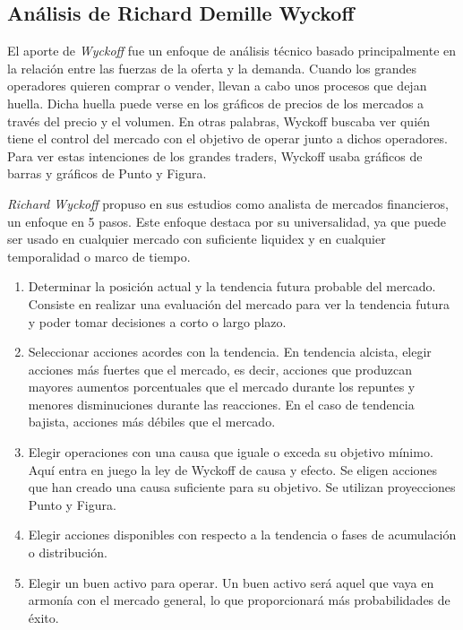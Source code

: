 \subsection{Análisis de Richard Demille Wyckoff}

El aporte de \textit{Wyckoff} fue un enfoque de análisis técnico basado principalmente en la relación entre las fuerzas de la oferta y la demanda. Cuando los grandes operadores quieren comprar o vender, llevan a cabo unos procesos que dejan huella. Dicha huella puede verse en los gráficos de precios de los mercados a través del precio y el volumen. En otras palabras, Wyckoff buscaba ver quién tiene el control del mercado con el objetivo de operar junto a dichos operadores. Para ver estas intenciones de los grandes traders, Wyckoff usaba gráficos de barras y gráficos de Punto y Figura. \newline

\textit{Richard Wyckoff} propuso en sus estudios como analista de mercados financieros, un enfoque en 5 pasos. Este enfoque destaca por su universalidad, ya que puede ser usado en cualquier mercado con suficiente liquidex y en cualquier temporalidad o marco de tiempo. \newline

\begin{enumerate}
	\item Determinar la posición actual y la tendencia futura probable del mercado. Consiste en realizar una evaluación del mercado para ver la tendencia futura y poder tomar decisiones a corto o largo plazo.
	\item Seleccionar acciones acordes con la tendencia. En tendencia alcista, elegir acciones más fuertes que el mercado, es decir, acciones que produzcan mayores aumentos porcentuales que el mercado durante los repuntes y menores disminuciones durante las reacciones. En el caso de tendencia bajista, acciones más débiles que el mercado.
	\item Elegir operaciones con una causa que iguale o exceda su objetivo mínimo. Aquí entra en juego la ley de Wyckoff de causa y efecto. Se eligen acciones que han creado una causa suficiente para su objetivo. Se utilizan proyecciones Punto y Figura.
	\item Elegir acciones disponibles con respecto a la tendencia o fases de acumulación o distribución.
	\item Elegir un buen activo para operar. Un buen activo será aquel que vaya en armonía con el mercado general, lo que proporcionará más probabilidades de éxito.
\end{enumerate}


